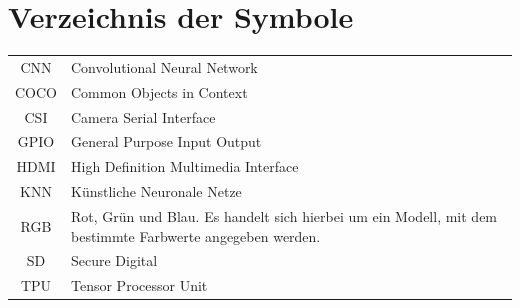 %
%
%


\chapter*{Verzeichnis der Symbole}




\begin{longtable}{cl}
  CNN        & Convolutional Neural Network \\
  COCO       & Common Objects in Context\\
  CSI        & Camera Serial Interface \\
  GPIO       & General Purpose Input Output \\
  HDMI       & High Definition Multimedia Interface\\
  KNN        & Künstliche Neuronale Netze \\
  RGB        &  Rot, Grün und Blau. Es handelt sich hierbei um ein Modell, mit dem bestimmte Farbwerte angegeben werden.\\
  SD         & Secure Digital \\
  TPU        & Tensor Processor Unit \\
\end{longtable}
